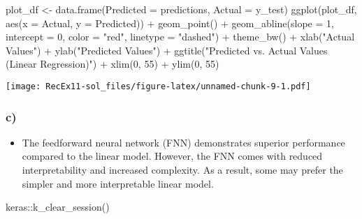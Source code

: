 \documentclass[
]{article}
\newenvironment{Shaded}{\begin{snugshade}}{\end{snugshade}}
\newcommand{\AttributeTok}[1]{\textcolor[rgb]{0.77,0.63,0.00}{#1}}
\newcommand{\DecValTok}[1]{\textcolor[rgb]{0.00,0.00,0.81}{#1}}
\newcommand{\FunctionTok}[1]{\textcolor[rgb]{0.00,0.00,0.00}{#1}}
\newcommand{\NormalTok}[1]{#1}
\newcommand{\OtherTok}[1]{\textcolor[rgb]{0.56,0.35,0.01}{#1}}
\newcommand{\SpecialCharTok}[1]{\textcolor[rgb]{0.00,0.00,0.00}{#1}}
\newcommand{\StringTok}[1]{\textcolor[rgb]{0.31,0.60,0.02}{#1}}
\providecommand{\tightlist}{%
  \setlength{\itemsep}{0pt}\setlength{\parskip}{0pt}}
\begin{document}
\begin{Shaded}
\begin{Highlighting}[]
\NormalTok{plot\_df }\OtherTok{\textless{}{-}} \FunctionTok{data.frame}\NormalTok{(}\AttributeTok{Predicted =}\NormalTok{ predictions, }\AttributeTok{Actual =}\NormalTok{ y\_test)}
\FunctionTok{ggplot}\NormalTok{(plot\_df, }\FunctionTok{aes}\NormalTok{(}\AttributeTok{x =}\NormalTok{ Actual, }\AttributeTok{y =}\NormalTok{ Predicted)) }\SpecialCharTok{+}
  \FunctionTok{geom\_point}\NormalTok{() }\SpecialCharTok{+}
  \FunctionTok{geom\_abline}\NormalTok{(}\AttributeTok{slope =} \DecValTok{1}\NormalTok{, }\AttributeTok{intercept =} \DecValTok{0}\NormalTok{, }\AttributeTok{color =} \StringTok{"red"}\NormalTok{, }\AttributeTok{linetype =} \StringTok{"dashed"}\NormalTok{) }\SpecialCharTok{+}
  \FunctionTok{theme\_bw}\NormalTok{() }\SpecialCharTok{+}
  \FunctionTok{xlab}\NormalTok{(}\StringTok{"Actual Values"}\NormalTok{) }\SpecialCharTok{+}
  \FunctionTok{ylab}\NormalTok{(}\StringTok{"Predicted Values"}\NormalTok{) }\SpecialCharTok{+}
  \FunctionTok{ggtitle}\NormalTok{(}\StringTok{"Predicted vs. Actual Values (Linear Regression)"}\NormalTok{) }\SpecialCharTok{+}
  \FunctionTok{xlim}\NormalTok{(}\DecValTok{0}\NormalTok{, }\DecValTok{55}\NormalTok{) }\SpecialCharTok{+}
  \FunctionTok{ylim}\NormalTok{(}\DecValTok{0}\NormalTok{, }\DecValTok{55}\NormalTok{)}
\end{Highlighting}
\end{Shaded}

\texttt{[image: RecEx11-sol\_files/figure-latex/unnamed-chunk-9-1.pdf]}

\hypertarget{c-2}{%
\subsubsection{c)}\label{c-2}}

\begin{itemize}
\tightlist
\item
  The feedforward neural network (FNN) demonstrates superior performance
  compared to the linear model. However, the FNN comes with reduced
  interpretability and increased complexity. As a result, some may
  prefer the simpler and more interpretable linear model.
\end{itemize}

\begin{Shaded}
\begin{Highlighting}[]
\NormalTok{keras}\SpecialCharTok{::}\FunctionTok{k\_clear\_session}\NormalTok{()}
\end{Highlighting}
\end{Shaded}
\end{document}
